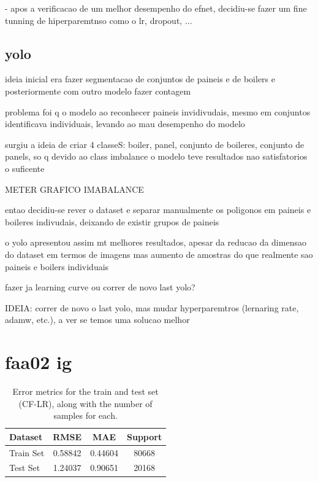 \documentclass[conference]{IEEEtran}
\begin{document}
- apos a verificacao de um melhor desempenho do efnet, decidiu-se fazer um fine tunning de hiperparemtnso como o lr, dropout, ...


\subsection{yolo}

ideia inicial era fazer segmentacao de conjuntos de paineis e de boilers e posteriormente com outro modelo fazer contagem

problema foi q o modelo ao reconhecer paineis invidivudais, mesmo em conjuntos identificava individuais, levando ao mau desempenho do modelo

surgiu a ideia de criar 4 classeS: boiler, panel, conjunto de boileres, conjunto de panels, so q devido ao class imbalance o modelo teve resultados nao satisfatorios o suficente

METER GRAFICO IMABALANCE

entao decidiu-se rever o dataset e separar manualmente os poligonos em paineis e boileres indivudais, deixando de existir grupos de paineis

o yolo apresentou assim mt melhores resultados, apesar da reducao da dimensao do dataset em termos de imagens mas aumento de amostras do que realmente sao paineis e boilers individuais


fazer ja learning curve ou correr de novo last yolo?

IDEIA: correr de novo o last yolo, mas mudar hyperparemtros (lernaring rate, adamw, etc.), a ver se temos uma solucao melhor



\section{faa02 ig}



\begin{table}[H]
\centering
\caption{Error metrics for the train and test set (CF-LR), along with the number of samples for each.}
\label{tab:model01_results}
\begin{tabular}{lccc}
\toprule
\textbf{Dataset} & \textbf{RMSE} & \textbf{MAE} & \textbf{Support} \\
\midrule
Train Set & 0.58842 & 0.44604 & 80668 \\
Test Set & 1.24037 & 0.90651 & 20168 \\
\bottomrule
\end{tabular}
\end{table}
\end{document}
